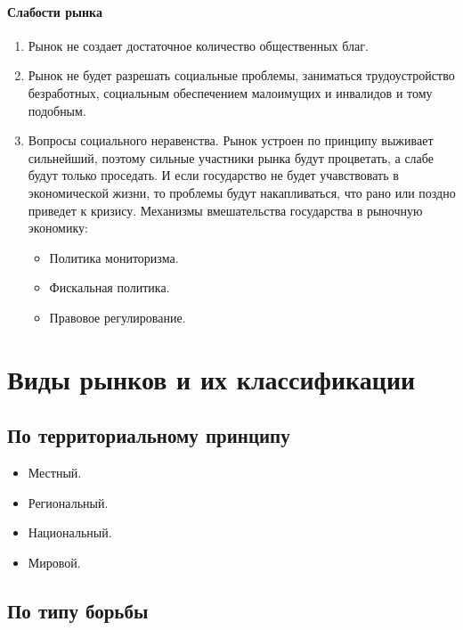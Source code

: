 \documentclass[12pt]{article}
\begin{document}
	\paragraph{Слабости рынка}
	
	\begin{enumerate}
		\item Рынок не создает достаточное количество общественных благ.
		\item Рынок не будет разрешать социальные проблемы, заниматься трудоустройство безработных, социальным обеспечением малоимущих и инвалидов и тому подобным.
		\item Вопросы социального неравенства. Рынок устроен по принципу выживает сильнейший, поэтому сильные участники рынка будут процветать, а слабе будут только проседать. И если государство не будет учавствовать в экономической жизни, то проблемы будут накапливаться, что рано или поздно приведет к кризису. Механизмы вмешательства государства в рыночную экономику:
		\begin{itemize}
			\item Политика мониторизма.
			\item Фискальная политика. 
			\item Правовое регулирование.
		\end{itemize}
	\end{enumerate}
	
	\section{Виды рынков и их классификации}
	
	\subsection{По территориальному принципу}
	
	\begin{itemize}
		\item Местный.
		\item Региональный.
		\item Национальный.
		\item Мировой.
	\end{itemize}
	
	\subsection{По типу борьбы}
	
\end{document}
